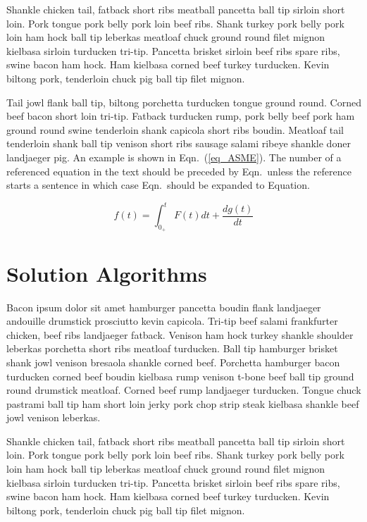 \documentclass[twocolumn,10pt]{asme2ej}
\begin{document}
Shankle chicken tail, fatback short ribs meatball pancetta ball tip sirloin short loin. Pork tongue pork belly pork loin beef ribs. Shank turkey pork belly pork loin ham hock ball tip leberkas meatloaf chuck ground round filet mignon kielbasa sirloin turducken tri-tip. Pancetta brisket sirloin beef ribs spare ribs, swine bacon ham hock. Ham kielbasa corned beef turkey turducken. Kevin biltong pork, tenderloin chuck pig ball tip filet mignon.

Tail jowl flank ball tip, biltong porchetta turducken tongue ground round. Corned beef bacon short loin tri-tip. Fatback turducken rump, pork belly beef pork ham ground round swine tenderloin shank capicola short ribs boudin. Meatloaf tail tenderloin shank ball tip venison short ribs sausage salami ribeye shankle doner landjaeger pig. An example is shown in Eqn.~(\ref{eq_ASME}). The number of a referenced equation in the text should be preceded by Eqn.\ unless the reference starts a sentence in which case Eqn.\ should be expanded to Equation.

\begin{equation}
f(t) = \int_{0_+}^t F(t) dt + \frac{d g(t)}{d t}
\label{eq_ASME}
\end{equation}

\section{Solution Algorithms}

Bacon ipsum dolor sit amet hamburger pancetta boudin flank landjaeger andouille drumstick prosciutto kevin capicola. Tri-tip beef salami frankfurter chicken, beef ribs landjaeger fatback. Venison ham hock turkey shankle shoulder leberkas porchetta short ribs meatloaf turducken. Ball tip hamburger brisket shank jowl venison bresaola shankle corned beef. Porchetta hamburger bacon turducken corned beef boudin kielbasa rump venison t-bone beef ball tip ground round drumstick meatloaf. Corned beef rump landjaeger turducken. Tongue chuck pastrami ball tip ham short loin jerky pork chop strip steak kielbasa shankle beef jowl venison leberkas.

Shankle chicken tail, fatback short ribs meatball pancetta ball tip sirloin short loin. Pork tongue pork belly pork loin beef ribs. Shank turkey pork belly pork loin ham hock ball tip leberkas meatloaf chuck ground round filet mignon kielbasa sirloin turducken tri-tip. Pancetta brisket sirloin beef ribs spare ribs, swine bacon ham hock. Ham kielbasa corned beef turkey turducken. Kevin biltong pork, tenderloin chuck pig ball tip filet mignon.
\end{document}
